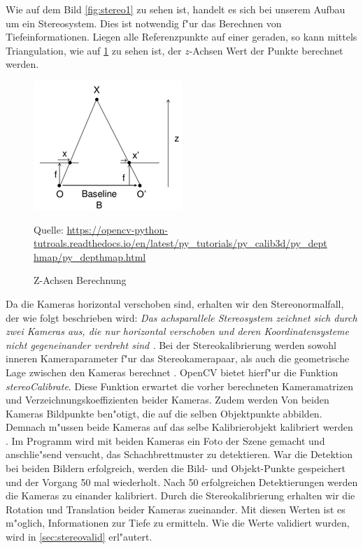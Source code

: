 Wie auf dem Bild \ref{fig:stereo1} zu sehen ist, handelt es sich bei unserem Aufbau um ein Stereosystem. Dies ist notwendig f"ur das Berechnen von Tiefeinformationen. Liegen alle Referenzpunkte auf einer geraden, so kann mittels Triangulation, wie auf \ref{fig:baseline} zu sehen ist, der $z$-Achsen Wert der Punkte berechnet werden.

\begin{figure}[H]
	\includegraphics[scale=1.5]{bilder/baseline}
	\caption[Z-Achsen Berechnung]{Z-Achsen Berechnung}
	\label{fig:baseline}%
	\small Quelle: \url{https://opencv-python-tutroals.readthedocs.io/en/latest/py_tutorials/py_calib3d/py_depthmap/py_depthmap.html}
\end{figure}

\noindent Da die Kameras horizontal verschoben sind, erhalten wir den Stereonormalfall, der wie folgt beschrieben wird: \textit{Das achsparallele Stereosystem zeichnet sich durch zwei Kameras aus, die nur horizontal verschoben und deren Koordinatensysteme nicht gegeneinander verdreht sind \cite{Tu}.} \newline
\noindent Bei der Stereokalibrierung werden sowohl inneren Kameraparameter f"ur das Stereokamerapaar, als auch die geometrische Lage zwischen den Kameras berechnet \cite{zbs}. OpenCV bietet hierf"ur die Funktion \textit{stereoCalibrate}. Diese Funktion erwartet die vorher berechneten Kameramatrizen und Verzeichnungskoeffizienten beider Kameras. Zudem werden Von beiden Kameras Bildpunkte ben"otigt, die auf die selben Objektpunkte abbilden. Demnach m"ussen beide Kameras auf das selbe Kalibrierobjekt kalibriert werden \cite{ocvs}. Im Programm wird mit beiden Kameras ein Foto der Szene gemacht und anschlie"send versucht, das Schachbrettmuster zu detektieren. War die Detektion bei beiden Bildern erfolgreich, werden die Bild- und Objekt-Punkte gespeichert und der Vorgang 50 mal wiederholt. Nach 50 erfolgreichen Detektierungen werden die Kameras zu einander kalibriert.\newline
Durch die Stereokalibrierung erhalten wir die Rotation und Translation beider Kameras zueinander. Mit diesen Werten ist es m"oglich, Informationen zur Tiefe zu ermitteln. Wie die Werte validiert wurden, wird in \ref{sec:stereovalid} erl"autert.


